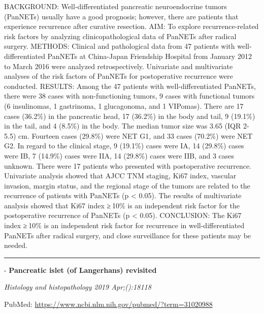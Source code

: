\documentclass[]{article}
\begin{document}
BACKGROUND: Well-differentiated pancreatic neuroendocrine tumors
(PanNETs) usually have a good prognosis; however, there are patients
that experience recurrence after curative resection. AIM: To explore
recurrence-related risk factors by analyzing clinicopathological data of
PanNETs after radical surgery. METHODS: Clinical and pathological data
from 47 patients with well-differentiated PanNETs at China-Japan
Friendship Hospital from January 2012 to March 2016 were analyzed
retrospectively. Univariate and multivariate analyses of the risk
factors of PanNETs for postoperative recurrence were conducted. RESULTS:
Among the 47 patients with well-differentiated PanNETs, there were 38
cases with non-functioning tumors, 9 cases with functional tumors (6
insulinomas, 1 gastrinoma, 1 glucagonoma, and 1 VIPomas). There are 17
cases (36.2\%) in the pancreatic head, 17 (36.2\%) in the body and tail,
9 (19.1\%) in the tail, and 4 (8.5\%) in the body. The median tumor size
was 3.65 (IQR 2-5.5) cm. Fourteen cases (29.8\%) were NET G1, and 33
cases (70.2\%) were NET G2. In regard to the clinical stage, 9 (19.1\%)
cases were IA, 14 (29.8\%) cases were IB, 7 (14.9\%) cases were IIA, 14
(29.8\%) cases were IIB, and 3 cases unknown. There were 17 patients who
presented with postoperative recurrence. Univariate analysis showed that
AJCC TNM staging, Ki67 index, vascular invasion, margin status, and the
regional stage of the tumors are related to the recurrence of patients
with PanNETs (p \textless{} 0.05). The results of multivariate analysis
showed that Ki67 index ≥ 10\% is an independent risk factor for the
postoperative recurrence of PanNETs (p \textless{} 0.05). CONCLUSION:
The Ki67 index ≥ 10\% is an independent risk factor for recurrence in
well-differentiated PanNETs after radical surgery, and close
surveillance for these patients may be needed.

{}

{}

\begin{center}\rule{0.5\linewidth}{\linethickness}\end{center}

 - \textbf{Pancreatic islet (of Langerhans) revisited}

\emph{Histology and histopathology 2019 Apr;():18118}

PubMed: \url{https://www.ncbi.nlm.nih.gov/pubmed/?term=31020988}
\end{document}
